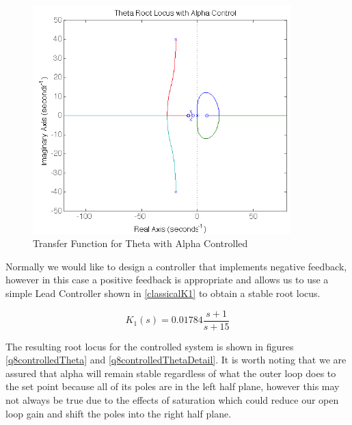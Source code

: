 \documentclass{article}
\theoremstyle{plain}
\theoremstyle{definition}
\theoremstyle{remark}
\begin{document}
\begin{figure}
\begin{center}
\includegraphics[width = 10cm]{thetaAlphaControl.png}
\end{center}
\caption{Transfer Function for Theta with Alpha Controlled}
\label{q8thetawAlphaControl}
\end{figure}

Normally we would like to design a controller that implements negative feedback, however in this case a positive feedback is appropriate and allows us to use a simple Lead Controller shown in \eqref{classicalK1} to obtain a stable root locus.

\begin{equation}
K_1(s) = 0.01784 \frac{s + 1}{s + 15}
\label{classicalK1}
\end{equation}

The resulting root locus for the controlled system is shown in figures \ref{q8controlledTheta} and \ref{q8controlledThetaDetail}.  It is worth noting that we are assured that alpha will remain stable regardless of what the outer loop does to the set point because all of its poles are in the left half plane, however this may not always be true due to the effects of saturation which could reduce our open loop gain and shift the poles into the right half plane. 
\end{document}

